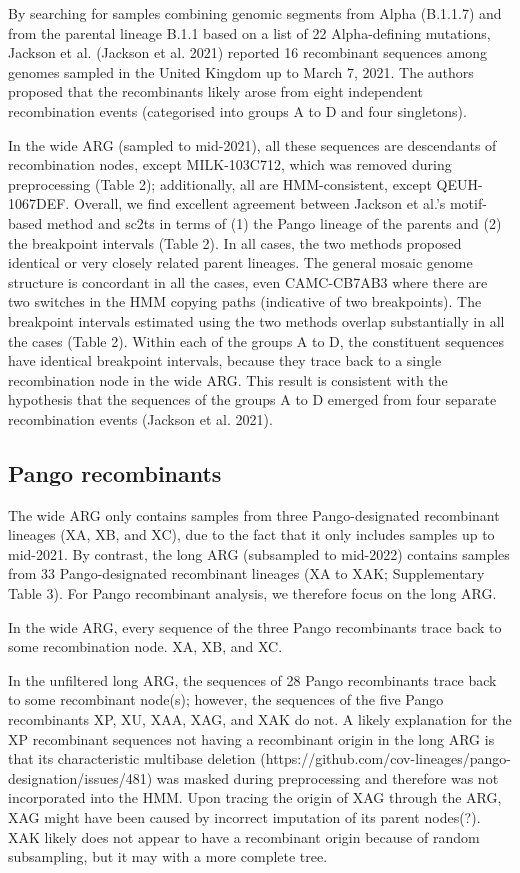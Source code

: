 \documentclass{article}
\begin{document}
By searching for samples combining genomic segments from Alpha (B.1.1.7) and from the parental lineage B.1.1 based on a list of 22 Alpha-defining mutations, Jackson et al. (Jackson et al. 2021) reported 16 recombinant sequences among genomes sampled in the United Kingdom up to March 7, 2021. The authors proposed that the recombinants likely arose from eight independent recombination events (categorised into groups A to D and four singletons).

In the wide ARG (sampled to mid-2021), all these sequences are descendants of recombination nodes, except MILK-103C712, which was removed during preprocessing (Table 2); additionally, all are HMM-consistent, except QEUH-1067DEF. Overall, we find excellent agreement between Jackson et al.’s motif-based method and sc2ts in terms of (1) the Pango lineage of the parents and (2) the breakpoint intervals (Table 2). In all cases, the two methods proposed identical or very closely related parent lineages. The general mosaic genome structure is concordant in all the cases, even CAMC-CB7AB3 where there are two switches in the HMM copying paths (indicative of two breakpoints). The breakpoint intervals estimated using the two methods overlap substantially in all the cases (Table 2). Within each of the groups A to D, the constituent sequences have identical breakpoint intervals, because they trace back to a single recombination node in the wide ARG. This result is consistent with the hypothesis that the sequences of the groups A to D emerged from four separate recombination events (Jackson et al. 2021).

\subsection{Pango recombinants}

The wide ARG only contains samples from three Pango-designated recombinant lineages (XA, XB, and XC), due to the fact that it only includes samples up to mid-2021. By contrast, the long ARG (subsampled to mid-2022) contains samples from 33 Pango-designated recombinant lineages (XA to XAK; Supplementary Table 3). For Pango recombinant analysis, we therefore focus on the long ARG.

In the wide ARG, every sequence of the three Pango recombinants trace back to some recombination node. XA, XB, and XC.

In the unfiltered long ARG, the sequences of 28 Pango recombinants trace back to some recombinant node(s); however, the sequences of the five Pango recombinants XP, XU, XAA, XAG, and XAK do not. A likely explanation for the XP recombinant sequences not having a recombinant origin in the long ARG is that its characteristic multibase deletion (https://github.com/cov-lineages/pango-designation/issues/481) was masked during preprocessing and therefore was not incorporated into the HMM.
Upon tracing the origin of XAG through the ARG, XAG might have been caused by incorrect imputation of its parent nodes(?). XAK likely does not appear to have a recombinant origin because of random subsampling, but it may with a more complete tree.
\end{document}
